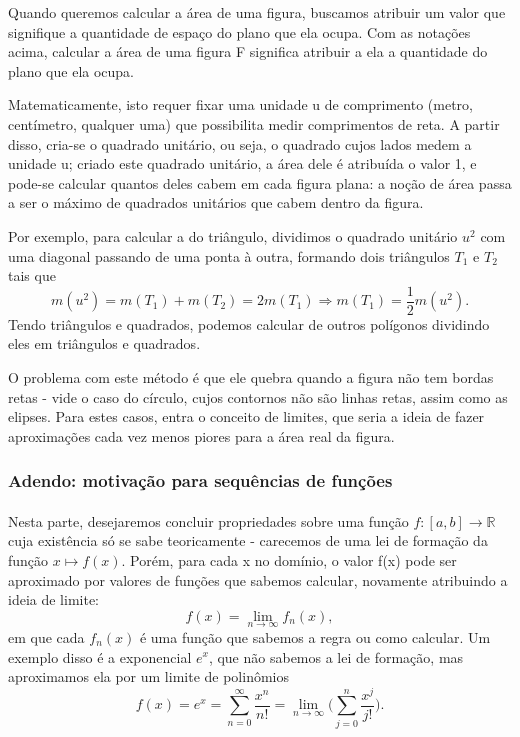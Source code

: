 \documentclass[../analysisII_notes.tex]{subfiles}
\begin{document}
Quando queremos calcular a área de uma figura, buscamos atribuir um valor que signifique a quantidade de espaço do plano que ela ocupa. Com as notações acima, calcular a área de uma figura F significa atribuir a ela a quantidade do plano que ela ocupa.

Matematicamente, isto requer fixar uma unidade u de comprimento (metro, centímetro, qualquer uma) que possibilita medir comprimentos de reta. A partir disso, cria-se o quadrado unitário, ou seja, o quadrado cujos lados medem a unidade u; criado este quadrado unitário, a área dele é atribuída o valor 1, e pode-se calcular quantos deles cabem em cada figura plana: a noção de área passa a ser o máximo de quadrados unitários que cabem dentro da figura.

Por exemplo, para calcular a do triângulo, dividimos o quadrado unitário \(u^{2}\) com uma diagonal passando de uma ponta à outra, formando dois triângulos \(T_1\) e \(T_2\) tais que
\[
	m(u^{2}) = m(T_1) + m(T_2) = 2m(T_1) \Rightarrow m(T_1) = \frac{1}{2}m(u^{2}).
\]
Tendo triângulos e quadrados, podemos calcular de outros polígonos dividindo eles em triângulos e quadrados.

O problema com este método é que ele quebra quando a figura não tem bordas retas - vide o caso do círculo, cujos contornos não são linhas retas, assim como as elipses. Para estes casos, entra o conceito de limites, que seria a ideia de fazer aproximações cada vez menos piores para a área real da figura.

\subsubsection{Adendo: motivação para sequências de funções}
\paragraph{} Nesta parte, desejaremos concluir propriedades sobre uma função \(f:[a, b]\rightarrow \mathbb{R}\) cuja existência só se sabe teoricamente - carecemos de uma lei de formação da função \(x\mapsto f(x)\). Porém, para cada x no domínio, o valor f(x) pode ser aproximado por valores de funções que sabemos calcular, novamente atribuindo a ideia de limite:
\[
	f(x) = \lim_{n\to \infty}f_{n}(x),
\]
em que cada \(f_{n}(x)\) é uma função que sabemos a regra ou como calcular. Um exemplo disso é a exponencial \(e^{x}\), que não sabemos a lei de formação, mas aproximamos ela por um limite de polinômios
\[
	f(x) = e^{x} = \sum\limits_{n=0}^{\infty}\frac{x^{n}}{n!} = \lim_{n\to \infty}\biggl(\sum\limits_{j=0}^{n}\frac{x^{j}}{j!}\biggr).
\]
\end{document}
